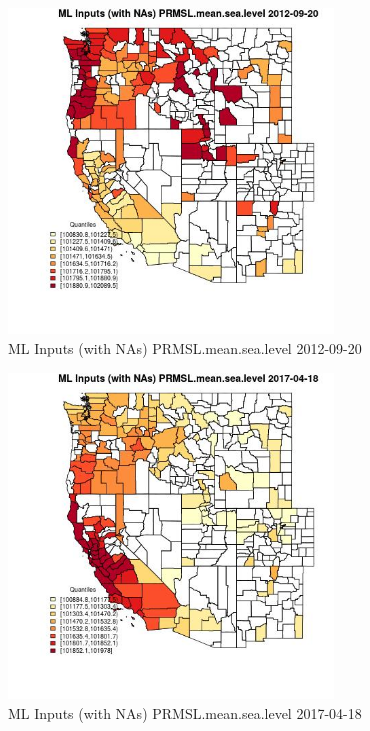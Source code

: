 \begin{figure} 
\centering  
\includegraphics[width=0.77\textwidth]{Code_Outputs/Report_ML_input_PM25_Step4_part_e_de_duplicated_aves_compiled_2019-05-14wNAs_CountyPRMSLmeansealevelMean2012-09-20_2012-09-20.jpg} 
\caption{\label{fig:Report_ML_input_PM25_Step4_part_e_de_duplicated_aves_compiled_2019-05-14wNAsCountyPRMSLmeansealevelMean2012-09-20_2012-09-20}ML Inputs (with NAs) PRMSL.mean.sea.level 2012-09-20} 
\end{figure} 
 

\begin{figure} 
\centering  
\includegraphics[width=0.77\textwidth]{Code_Outputs/Report_ML_input_PM25_Step4_part_e_de_duplicated_aves_compiled_2019-05-14wNAs_CountyPRMSLmeansealevelMean2017-04-18_2017-04-18.jpg} 
\caption{\label{fig:Report_ML_input_PM25_Step4_part_e_de_duplicated_aves_compiled_2019-05-14wNAsCountyPRMSLmeansealevelMean2017-04-18_2017-04-18}ML Inputs (with NAs) PRMSL.mean.sea.level 2017-04-18} 
\end{figure} 
 

